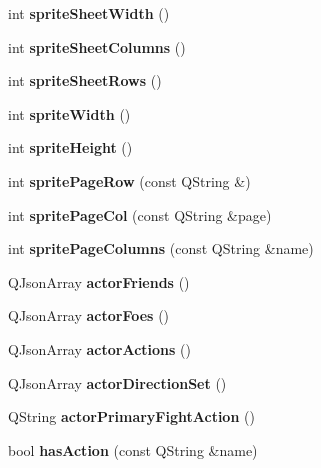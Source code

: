 \begin{DoxyCompactItemize}
int {\bfseries sprite\+Sheet\+Width} ()
\item 
\mbox{\label{class_asset_manager_a629953081d689b6ce4ae68c86ba292cf}} 
int {\bfseries sprite\+Sheet\+Columns} ()
\item 
\mbox{\label{class_asset_manager_ae7df2f180d987957d1b28959ba39643d}} 
int {\bfseries sprite\+Sheet\+Rows} ()
\item 
\mbox{\label{class_asset_manager_aa3161c0ad9ac8dbab9d8732a47335f22}} 
int {\bfseries sprite\+Width} ()
\item 
\mbox{\label{class_asset_manager_ab800356c8b05a8fed62e522a3cea11d9}} 
int {\bfseries sprite\+Height} ()
\item 
\mbox{\label{class_asset_manager_a716db89db2e5cf1405d3cf3906f581b7}} 
int {\bfseries sprite\+Page\+Row} (const Q\+String \&)
\item 
\mbox{\label{class_asset_manager_a554a984f9edbac3fd4b2a52e983ea74d}} 
int {\bfseries sprite\+Page\+Col} (const Q\+String \&page)
\item 
\mbox{\label{class_asset_manager_abe76754e3b6a55d19969772a12dd42f8}} 
int {\bfseries sprite\+Page\+Columns} (const Q\+String \&name)
\item 
\mbox{\label{class_asset_manager_a577dacd1b7f1631f808fe7c68c4638de}} 
Q\+Json\+Array {\bfseries actor\+Friends} ()
\item 
\mbox{\label{class_asset_manager_ac0d791cc43c7dd68fd8ff43fb69a3619}} 
Q\+Json\+Array {\bfseries actor\+Foes} ()
\item 
\mbox{\label{class_asset_manager_a98e88dbd0bdc8e409d13815556071a2a}} 
Q\+Json\+Array {\bfseries actor\+Actions} ()
\item 
\mbox{\label{class_asset_manager_afbd4c4a3edfef4a4d7fe68e1a1953a2c}} 
Q\+Json\+Array {\bfseries actor\+Direction\+Set} ()
\item 
\mbox{\label{class_asset_manager_ab114e7886b4de3519590f913f508706a}} 
Q\+String {\bfseries actor\+Primary\+Fight\+Action} ()
\item 
\mbox{\label{class_asset_manager_a2c2b23679fe2e0e736e12beeaae99198}} 
bool {\bfseries has\+Action} (const Q\+String \&name)
\end{DoxyCompactItemize}
